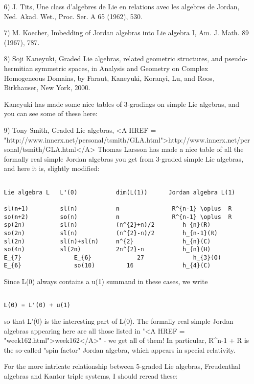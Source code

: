 6) J. Tits, Une class d'algebres de Lie en relations avec les algebres
de Jordan, Ned. Akad. Wet., Proc. Ser. A 65 (1962), 530.

7) M. Koecher, Imbedding of Jordan algebras into Lie algebra I,
Am. J. Math. 89 (1967), 787. 

8) Soji Kaneyuki, Graded Lie algebras, related geometric structures,
and pseudo-hermitian symmetric spaces, in Analysis and Geometry on 
Complex Homogeneous Domains, by Faraut, Kaneyuki, Koranyi, Lu, and 
Roos, Birkhauser, New York, 2000.

Kaneyuki has made some nice tables of 3-gradings on simple Lie
algebras, and you can see some of these here:

9) Tony Smith, Graded Lie algebras, 
<A HREF = "http://www.innerx.net/personal/tsmith/GLA.html">http://www.innerx.net/personal/tsmith/GLA.html</A>
Thomas Larsson has made a nice table of all the formally real
simple Jordan algebras you get from 3-graded simple Lie algebras, 
and here it is, slightly modified:


\begin{verbatim}

Lie algebra L   L'(0)           dim(L(1))      Jordan algebra L(1)

sl(n+1)         sl(n)           n               R^{n-1} \oplus  R
so(n+2)         so(n)           n               R^{n-1} \oplus  R
sp(2n)          sl(n)           (n^{2}+n)/2        h_{n}(R)
so(2n)          sl(n)           (n^{2}-n)/2        h_{n-1}(R)
sl(2n)          sl(n)+sl(n)     n^{2}              h_{n}(C)
so(4n)          sl(2n)          2n^{2}-n           h_{n}(H)
E_{7}               E_{6}             27              h_{3}(O)
E_{6}               so(10)         16              h_{4}(C)
\end{verbatim}
    
Since L(0) always contains a u(1) summand in these cases, we
write 


\begin{verbatim}

L(0) = L'(0) + u(1)
\end{verbatim}
    
so that L'(0) is the interesting part of L(0).  The formally
real simple Jordan algebras appearing here are all those listed
in "<A HREF = "week162.html">week162</A>" - we get all of them!  
In particular, R^{n-1} + R is 
the so-called "spin factor" Jordan algebra, which appears
in special relativity.  

For the more intricate relationship between 5-graded Lie algebras, 
Freudenthal algebras and Kantor triple systems, I should reread these: 

